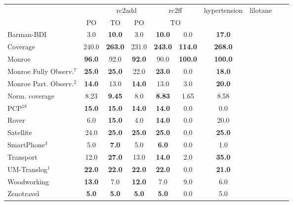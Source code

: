 \begin{tabular}{lccccccccccl} 
\toprule 
  && \multicolumn{2}{c}{rc2add} & \multicolumn{2}{c}{rc2ff} & \multicolumn{2}{c}{hypertension} & \multicolumn{2}{c}{lilotane} \\ 
\cmidrule(lr){3-4} \cmidrule(lr){5-6} \cmidrule(lr){7-8} \cmidrule(lr){9-10}  
 &PO & TO & PO &\multicolumn{2}{c}{ TO  } \\ 
\midrule 
Barman-BDI & 3.0 & \textbf{10.0} & 3.0 & \textbf{10.0} & 0.0 &\multicolumn{2}{c}{ \textbf{17.0}  } \\ 
\midrule 
 Coverage & 240.0 & \textbf{263.0} & 231.0 & \textbf{243.0} & \textbf{114.0} &\multicolumn{2}{c}{ \textbf{268.0}  } \\ 
\midrule 
 Monroe & \textbf{96.0} & 92.0 & \textbf{92.0} & 90.0 & \textbf{100.0} &\multicolumn{2}{c}{ \textbf{100.0}  } \\ 
Monroe Fully Observ.$^{7}$ & \textbf{25.0} & \textbf{25.0} & 22.0 & \textbf{23.0} & 0.0 &\multicolumn{2}{c}{ \textbf{18.0}  } \\ 
Monroe Part. Observ.$^{2}$ & \textbf{14.0} & 13.0 & \textbf{14.0} & 13.0 & 3.0 &\multicolumn{2}{c}{ \textbf{20.0}  } \\ 
Norm. coverage & 8.23 & \textbf{9.45} & 8.0 & \textbf{8.83} & 1.65 &\multicolumn{2}{c}{ 8.58  } \\ 
PCP$^{18}$ & \textbf{15.0} & \textbf{15.0} & \textbf{14.0} & \textbf{14.0} & 0.0 &\multicolumn{2}{c}{ 0.0  } \\ 
Rover & 6.0 & \textbf{15.0} & 4.0 & \textbf{14.0} & 0.0 &\multicolumn{2}{c}{ 20.0  } \\ 
Satellite & 24.0 & \textbf{25.0} & \textbf{25.0} & \textbf{25.0} & 0.0 &\multicolumn{2}{c}{ \textbf{25.0}  } \\ 
SmartPhone$^{3}$ & 5.0 & \textbf{7.0} & 5.0 & \textbf{6.0} & 0.0 &\multicolumn{2}{c}{ 1.0  } \\ 
Transport & 12.0 & \textbf{27.0} & 13.0 & \textbf{14.0} & 2.0 &\multicolumn{2}{c}{ \textbf{35.0}  } \\ 
UM-Translog$^{1}$ & \textbf{22.0} & \textbf{22.0} & \textbf{22.0} & \textbf{22.0} & 0.0 &\multicolumn{2}{c}{ \textbf{21.0}  } \\ 
Woodworking & \textbf{13.0} & 7.0 & \textbf{12.0} & 7.0 & 9.0 &\multicolumn{2}{c}{ 6.0  } \\ 
Zenotravel & \textbf{5.0} & \textbf{5.0} & \textbf{5.0} & \textbf{5.0} & 0.0 &\multicolumn{2}{c}{ 5.0  } \\ 
\bottomrule 
 \end{tabular} 
